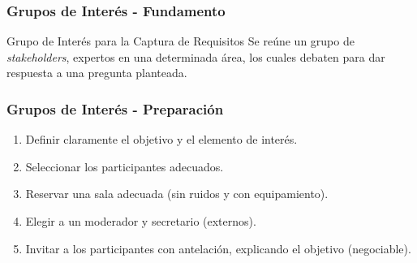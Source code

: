﻿\documentclass[handout,a4paper,slidestop,xcolor=pst,dvips,blue]{beamer}
\begin{document}
\begin{frame}[t]
    \frametitle{Grupos de Interés - Fundamento}
    \begin{block}{Grupo de Interés para la Captura de Requisitos}
        Se reúne un grupo de \emph{stakeholders}, expertos en una determinada área, los cuales debaten para dar respuesta a una pregunta planteada.
    \end{block}


\end{frame}

\begin{frame}[c]
    \frametitle{Grupos de Interés - Preparación}
    \begin{enumerate}[<+->]
        \item Definir claramente el objetivo y el elemento de interés.
        \item Seleccionar los participantes adecuados.
        \item Reservar una sala adecuada (sin ruidos y con equipamiento).
        \item Elegir a un moderador y secretario (externos).
        \item Invitar a los participantes con antelación, explicando el objetivo (negociable).
    \end{enumerate}
\end{frame}
\end{document}
